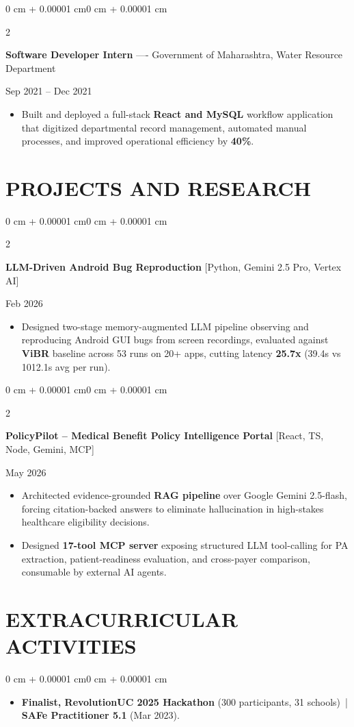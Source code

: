 \documentclass[10pt, letterpaper]{article}
\newenvironment{highlights}{
    \begin{itemize}[
        topsep=0.10 cm,
        parsep=0.06 cm,
        partopsep=0pt,
        itemsep=0.06 cm,
        leftmargin=12pt
    ]
}{
    \end{itemize}
}
\newenvironment{onecolentry}{
    \begin{adjustwidth}{0 cm + 0.00001 cm}{0 cm + 0.00001 cm}
}{
    \end{adjustwidth}
}
\newenvironment{twocolentry}[2][]{
    \onecolentry
    \def\secondColumn{#2}
    \setcolumnwidth{\fill, 4.5 cm}
    \begin{paracol}{2}
}{
    \switchcolumn \raggedleft \secondColumn
    \end{paracol}
    \endonecolentry
}
\begin{document}
\begin{twocolentry}{Sep 2021 -- Dec 2021}
\textbf{Software Developer Intern} ---- Government of Maharashtra, Water Resource Department
\end{twocolentry}
\begin{highlights}
  \item Built and deployed a full-stack \textbf{React and MySQL} workflow application that digitized departmental record management, automated manual processes, and improved operational efficiency by \textbf{40\%}.
\end{highlights}

\section{PROJECTS AND RESEARCH}
\begin{twocolentry}{Feb 2026}
\textbf{LLM-Driven Android Bug Reproduction} [Python, Gemini 2.5 Pro, Vertex AI]
\end{twocolentry}
\begin{highlights}
  \item Designed two-stage memory-augmented LLM pipeline observing and reproducing Android GUI bugs from screen recordings, evaluated against \textbf{ViBR} baseline across 53 runs on 20+ apps, cutting latency \textbf{25.7x} (39.4s vs 1012.1s avg per run).
\end{highlights}

\vspace{0.12 cm}

\begin{twocolentry}{May 2026}
\textbf{PolicyPilot -- Medical Benefit Policy Intelligence Portal} [React, TS, Node, Gemini, MCP]
\end{twocolentry}
\begin{highlights}
  \item Architected evidence-grounded \textbf{RAG pipeline} over Google Gemini 2.5-flash, forcing citation-backed answers to eliminate hallucination in high-stakes healthcare eligibility decisions.
  \item Designed \textbf{17-tool MCP server} exposing structured LLM tool-calling for PA extraction, patient-readiness evaluation, and cross-payer comparison, consumable by external AI agents.
\end{highlights}

\section{EXTRACURRICULAR ACTIVITIES}
\begin{onecolentry}
\begin{highlights}
  \item \textbf{Finalist, RevolutionUC 2025 Hackathon} (300 participants, 31 schools) \,|\, \textbf{SAFe Practitioner 5.1} (Mar 2023).
\end{highlights}
\end{onecolentry}
\end{document}
